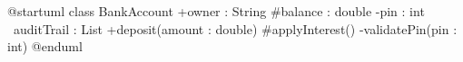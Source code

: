 \documentclass{scrartcl}
\begin{document}
\begin{plantuml}
@startuml
class BankAccount {
  +owner : String
  #balance : double
  -pin : int
  ~auditTrail : List
  +deposit(amount : double)
  #applyInterest()
  -validatePin(pin : int)
}
@enduml
\end{plantuml}
\end{document}

